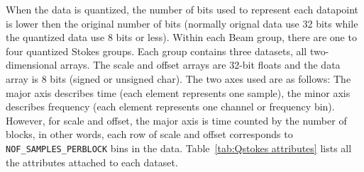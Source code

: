 \documentclass[a4paper,10pt,bibtotoc]{scrartcl}
\begin{document}
When the data is quantized, the number of bits used to represent each datapoint is lower then the original number of bits (normally orignal data use 32 bits while the quantized data use 8 bits or less).
Within each Beam group, there are one to four quantized Stokes groups. Each group contains three datasets, all two-dimensional arrays. The scale and offset arrays are 32-bit floats and the data array is 8 bits (signed or unsigned char).  The two axes used are as follows: The major axis describes time (each element represents one sample), the minor axis describes frequency (each element represents one channel or frequency bin). However, for scale and offset, the major axis is time counted by the number of blocks, in other words, each row of scale and offset corresponds to \verb|NOF_SAMPLES_PERBLOCK| bins in the data. Table~\ref{tab:Qstokes attributes} lists all the attributes attached to each dataset.
\end{document}
